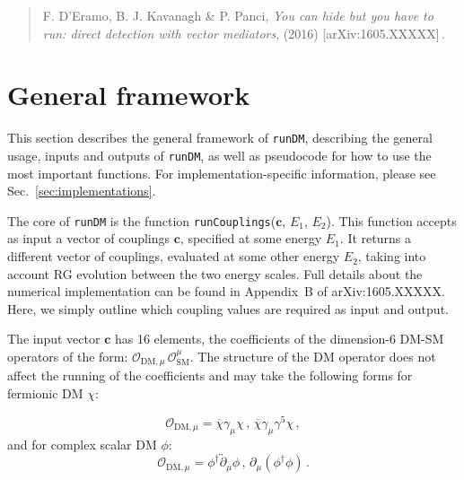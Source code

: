 \documentclass[notitlepage,12pt]{article}
\newcommand{\runDM}{\texttt{runDM}\xspace}
\begin{document}
\begin{quote}
F. D'Eramo, B. J. Kavanagh \& P. Panci, \textit{You can hide but you have to run: direct detection with vector mediators}, (2016) [arXiv:1605.XXXXX]\,.
\end{quote}


\section{General framework}

This section describes the general framework of \runDM, describing the general usage, inputs and outputs of \runDM, as well as pseudocode for how to use the most important functions. For implementation-specific information, please see Sec.~\ref{sec:implementations}.

The core of \runDM is the function \texttt{runCouplings}($\mathbf{c}$, $E_1$, $E_2$). This function accepts as input a vector of couplings $\mathbf{c}$, specified at some energy $E_1$. It returns a different vector of couplings, evaluated at some other energy $E_2$, taking into account RG evolution between the two energy scales. Full details about the numerical implementation can be found in Appendix~B of arXiv:1605.XXXXX. Here, we simply outline which coupling values are required as input and output.

The input vector  $\mathbf{c}$ has 16 elements, the coefficients of the dimension-6 DM-SM operators of the form: $\mathcal{O}_{\mathrm{DM},\mu} \, \mathcal{O}_\mathrm{SM}^\mu$. The structure of the DM operator does not affect the running of the coefficients and may take the following forms for fermionic DM $\chi$:

\begin{equation}
\mathcal{O}_{\mathrm{DM},\mu} = \overline{\chi}\gamma_\mu \chi\,, \,\overline{\chi} \gamma_\mu \gamma^5 \chi\,,
\end{equation}
and for complex scalar DM $\phi$:
\begin{equation}
\mathcal{O}_{\mathrm{DM},\mu} = \phi^\dagger \overleftrightarrow{\partial}_\mu \phi\, , \, \partial_\mu (\phi^\dagger \phi)\,.\end{equation}
\end{document}
